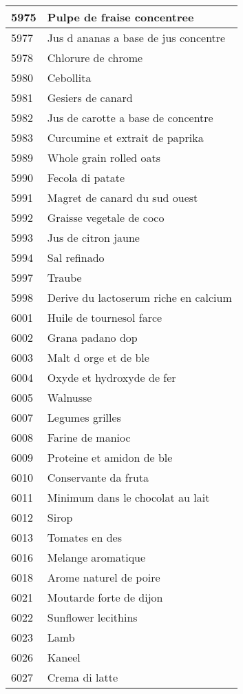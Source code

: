 \begin{longtable}{|l|l|}
5975 & Pulpe de fraise concentree \\ \hline 
5977 & Jus d ananas a base de jus concentre \\ \hline 
5978 & Chlorure de chrome \\ \hline 
5980 & Cebollita \\ \hline 
5981 & Gesiers de canard \\ \hline 
5982 & Jus de carotte a base de concentre \\ \hline 
5983 & Curcumine et extrait de paprika \\ \hline 
5989 & Whole grain rolled oats \\ \hline 
5990 & Fecola di patate \\ \hline 
5991 & Magret de canard du sud ouest \\ \hline 
5992 & Graisse vegetale de coco \\ \hline 
5993 & Jus de citron jaune \\ \hline 
5994 & Sal refinado \\ \hline 
5997 & Traube \\ \hline 
5998 & Derive du lactoserum riche en calcium \\ \hline 
6001 & Huile de tournesol farce \\ \hline 
6002 & Grana padano dop \\ \hline 
6003 & Malt d orge et de ble \\ \hline 
6004 & Oxyde et hydroxyde de fer \\ \hline 
6005 & Walnusse \\ \hline 
6007 & Legumes grilles \\ \hline 
6008 & Farine de manioc \\ \hline 
6009 & Proteine et amidon de ble \\ \hline 
6010 & Conservante da fruta \\ \hline 
6011 & Minimum dans le chocolat au lait \\ \hline 
6012 & Sirop \\ \hline 
6013 & Tomates en des \\ \hline 
6016 & Melange aromatique \\ \hline 
6018 & Arome naturel de poire \\ \hline 
6021 & Moutarde forte de dijon \\ \hline 
6022 & Sunflower lecithins \\ \hline 
6023 & Lamb \\ \hline 
6026 & Kaneel \\ \hline 
6027 & Crema di latte \\ \hline 

\end{longtable}
